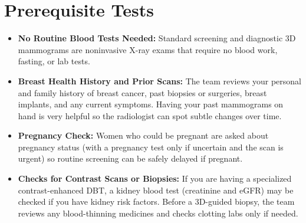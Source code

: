 \section{Prerequisite Tests}
\begin{itemize}
\item \textbf{No Routine Blood Tests Needed:} Standard screening and diagnostic 3D mammograms are noninvasive X-ray exams that require no blood work, fasting, or lab tests.
\item \textbf{Breast Health History and Prior Scans:} The team reviews your personal and family history of breast cancer, past biopsies or surgeries, breast implants, and any current symptoms. Having your past mammograms on hand is very helpful so the radiologist can spot subtle changes over time.
\item \textbf{Pregnancy Check:} Women who could be pregnant are asked about pregnancy status (with a pregnancy test only if uncertain and the scan is urgent) so routine screening can be safely delayed if pregnant.
\item \textbf{Checks for Contrast Scans or Biopsies:} If you are having a specialized contrast-enhanced DBT, a kidney blood test (creatinine and eGFR) may be checked if you have kidney risk factors. Before a 3D-guided biopsy, the team reviews any blood-thinning medicines and checks clotting labs only if needed.
\end{itemize}

